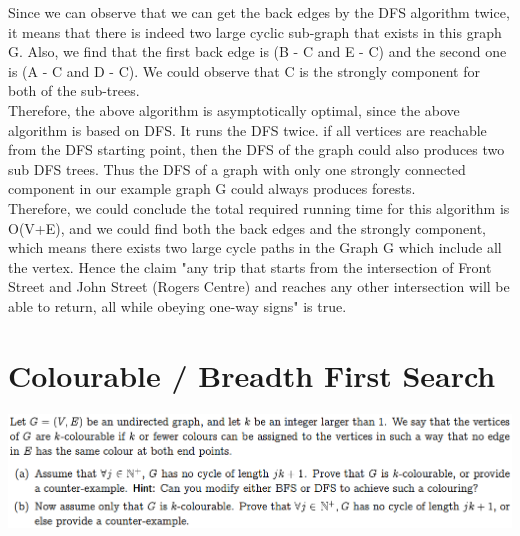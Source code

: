 \documentclass{article}
\begin{document}
\begin{center}
\end{center}

\noindent Since we can observe that we can get the back edges by the DFS algorithm twice, it means that there is indeed two large cyclic sub-graph that exists in this graph G. Also, we find that the first back edge is (B - C and E - C) and the second one is (A - C and D - C). We could observe that C is the strongly component for both of the sub-trees. \\

\noindent Therefore, the above algorithm is asymptotically optimal, since the above algorithm is based on DFS. It runs the DFS twice. if all vertices are reachable from the DFS starting point, then the DFS of the graph could also produces two sub DFS trees. Thus the DFS of a graph with only one strongly connected component in our example graph G could always produces forests.\\

\noindent Therefore, we could conclude the total required running time for this algorithm is O(V+E), and we could find both the back edges and the strongly component, which means there exists two large cycle paths in the Graph G which include all the vertex. Hence the claim "any trip that starts from the intersection of Front Street and John Street (Rogers Centre) and reaches any other intersection will be able to return, all while obeying one-way signs" is true.\\
\newpage
\section*{Colourable / Breadth First Search}
\includegraphics[width=\textwidth]{Colourable}
\end{document}

